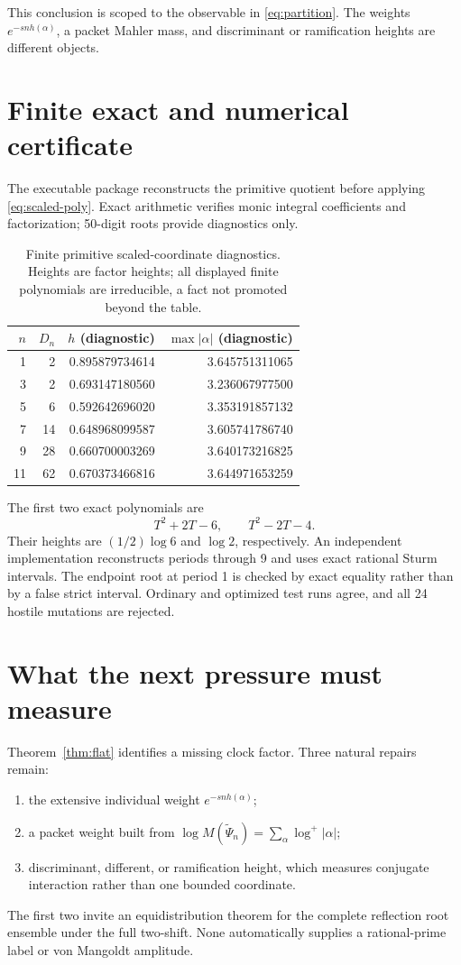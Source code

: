 \documentclass[11pt]{article}
\theoremstyle{remark}
\newcommand{\htw}{h}
\begin{document}
This conclusion is scoped to the observable in \eqref{eq:partition}.  The
weights $e^{-sn\htw(\alpha)}$, a packet Mahler mass, and discriminant or
ramification heights are different objects.

\section{Finite exact and numerical certificate}
The executable package reconstructs the primitive quotient before applying
\eqref{eq:scaled-poly}.  Exact arithmetic verifies monic integral
coefficients and factorization; 50-digit roots provide diagnostics only.

\begin{table}[ht]
\centering
\caption{Finite primitive scaled-coordinate diagnostics.  Heights are
factor heights; all displayed finite polynomials are irreducible, a fact not
promoted beyond the table.}
\begin{tabular}{rrrr}
\toprule
$n$ & $D_n$ & $\htw$ (diagnostic) & $\max|\alpha|$ (diagnostic)\\
\midrule
1  & 2  & 0.895879734614 & 3.645751311065\\
3  & 2  & 0.693147180560 & 3.236067977500\\
5  & 6  & 0.592642696020 & 3.353191857132\\
7  & 14 & 0.648968099587 & 3.605741786740\\
9  & 28 & 0.660700003269 & 3.640173216825\\
11 & 62 & 0.670373466816 & 3.644971653259\\
\bottomrule
\end{tabular}
\end{table}

The first two exact polynomials are
\[
T^2+2T-6,\qquad T^2-2T-4.
\]
Their heights are $(1/2)\log6$ and $\log2$, respectively.  An independent
implementation reconstructs periods through 9 and uses exact rational Sturm
intervals.  The endpoint root at period 1 is checked by exact equality rather
than by a false strict interval.  Ordinary and optimized test runs agree, and
all 24 hostile mutations are rejected.

\section{What the next pressure must measure}
Theorem~\ref{thm:flat} identifies a missing clock factor.  Three natural
repairs remain:
\begin{enumerate}
\item the extensive individual weight $e^{-sn\htw(\alpha)}$;
\item a packet weight built from
$\log M(\widetilde\Psi_n)=\sum_\alpha\log^+|\alpha|$;
\item discriminant, different, or ramification height, which measures
conjugate interaction rather than one bounded coordinate.
\end{enumerate}
The first two invite an equidistribution theorem for the complete reflection
root ensemble under the full two-shift.  None automatically supplies a
rational-prime label or von Mangoldt amplitude.
\end{document}
